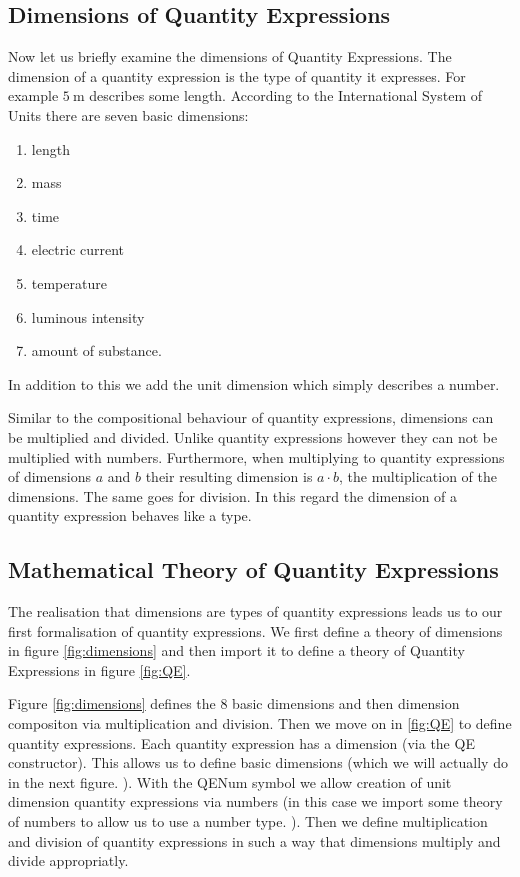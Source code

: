 \subsection{Dimensions of Quantity Expressions}
Now let us briefly examine the dimensions of Quantity Expressions. The dimension of a quantity expression is the type of quantity it expresses. For example $5\ \text{m}$ describes some length. According to the International System of Units there are seven basic dimensions:
\begin{enumerate}
  \item length
  \item mass
  \item time
  \item electric current
  \item temperature
  \item luminous intensity
  \item amount of substance.
\end{enumerate}

In addition to this we add the unit dimension which simply describes a number.

Similar to the compositional behaviour of quantity expressions, dimensions can be multiplied and divided. Unlike quantity expressions however they can not be multiplied with numbers. Furthermore, when multiplying to quantity expressions of dimensions $a$ and $b$ their resulting dimension is $a \cdot{} b$, the multiplication of the dimensions. The same goes for division. In this regard the dimension of a quantity expression behaves like a type.

\subsection{Mathematical Theory of Quantity Expressions}
\label{sec:qeform}

The realisation that dimensions are types of quantity expressions leads us to our first formalisation of quantity expressions. We first define a theory of dimensions in figure \ref{fig:dimensions} and then import it to define a theory of Quantity Expressions in figure \ref{fig:QE}.





Figure \ref{fig:dimensions} defines the 8 basic dimensions and then dimension compositon via multiplication and division. Then we move on in \ref{fig:QE} to define quantity expressions. Each quantity expression has a dimension (via the QE constructor). This allows us to define basic dimensions (which we will actually do in the next figure. ). With the QENum symbol we allow creation of unit dimension quantity expressions via numbers (in this case we import some theory of numbers to allow us to use a number type. ). Then we define multiplication and division of quantity expressions in such a way that dimensions multiply and divide appropriatly.

